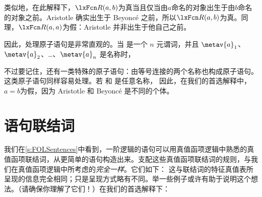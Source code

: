 类似地，在此解释下，$\atom{R}{a,b}$为真当且仅当由$a$命名的对象出生于由$b$命名的对象之前。Aristotle 确实出生于 Beyoncé 之前，所以$\atom{R}{a,b}$为真。同理，$\atom{R}{a,a}$为假：Aristotle 并非出生于他自己之前。

因此，处理原子语句是非常直观的。当  是一个 $n$ 元谓词，并且 $\metav{a}_1$、$\metav{a}_{2}$、\dots、$\metav{a}_{n}$ 是名称时，

不过要记住，还有一类特殊的原子语句：由等号连接的两个名称也构成原子语句。这类原子语句同样容易处理。若  和  是任意名称，
因此，在我们的首选解释中，$a = b$为假，因为 Aristotle 和 Beyoncé 是不同的个体。

\section{语句联结词}
我们在\cref{s:FOLSentences}中看到，一阶逻辑的语句可以用真值函项逻辑中熟悉的真值函项联结词，从更简单的语句构造出来。支配这些真值函项联结词的规则，与我们在真值函项逻辑中所考虑的\emph{完全一样}。它们如下：
这与联结词的特征真值表所呈现的信息完全相同；只是呈现方式略有不同。举一些例子或许有助于说明这个想法。（请确保你理解了它们！）在我们的首选解释下：


